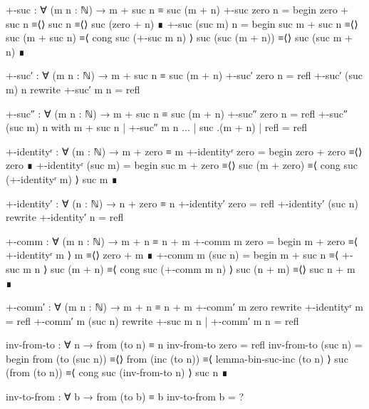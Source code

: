\begin{code}
+-suc : ∀ (m n : ℕ) → m + suc n ≡ suc (m + n)
+-suc zero n =
  begin
    zero + suc n
  ≡⟨⟩
    suc n
  ≡⟨⟩
    suc (zero + n)
  ∎
+-suc (suc m) n =
  begin
    suc m + suc n
  ≡⟨⟩
    suc (m + suc n)
  ≡⟨ cong suc (+-suc m n) ⟩
    suc (suc (m + n))
  ≡⟨⟩
    suc (suc m + n)
  ∎

+-suc′ : ∀ (m n : ℕ) → m + suc n ≡ suc (m + n)
+-suc′ zero n = refl
+-suc′ (suc m) n rewrite +-suc′ m n = refl

+-suc″ : ∀ (m n : ℕ) → m + suc n ≡ suc (m + n)
+-suc″ zero n = refl
+-suc″ (suc m) n with m + suc n    | +-suc″ m n
...                 | suc .(m + n) | refl = refl

+-identityʳ : ∀ (m : ℕ) → m + zero ≡ m
+-identityʳ zero =
  begin
    zero + zero
  ≡⟨⟩
    zero
  ∎
+-identityʳ (suc m) =
  begin
    suc m + zero
  ≡⟨⟩
    suc (m + zero)
  ≡⟨ cong suc (+-identityʳ m) ⟩
    suc m
  ∎

+-identity′ : ∀ (n : ℕ) → n + zero ≡ n
+-identity′ zero = refl
+-identity′ (suc n) rewrite +-identity′ n = refl

+-comm : ∀ (m n : ℕ) → m + n ≡ n + m
+-comm m zero =
  begin
    m + zero
  ≡⟨ +-identityʳ m ⟩
    m
  ≡⟨⟩
    zero + m
  ∎
+-comm m (suc n) =
  begin
    m + suc n
  ≡⟨ +-suc m n ⟩
    suc (m + n)
  ≡⟨ cong suc (+-comm m n) ⟩
    suc (n + m)
  ≡⟨⟩
    suc n + m
  ∎

+-comm′ : ∀ (m n : ℕ) → m + n ≡ n + m
+-comm′ m zero rewrite +-identityʳ m = refl
+-comm′ m (suc n) rewrite +-suc m n | +-comm′ m n = refl


inv-from-to : ∀ n → from (to n) ≡ n
inv-from-to zero = refl
inv-from-to (suc n) =
  begin
    from (to (suc n))
  ≡⟨⟩
    from (inc (to n))
  ≡⟨ lemma-bin-suc-inc (to n) ⟩
    suc (from (to n))
  ≡⟨ cong suc (inv-from-to n) ⟩
    suc n
  ∎

inv-to-from : ∀ b → from (to b) ≡ b
inv-to-from b = ?
\end{code}
